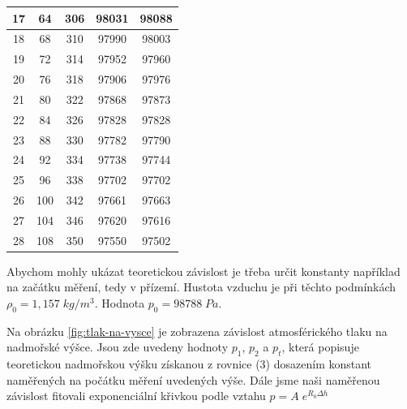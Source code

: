 \begin{table}[h]
\begin{tabular}{|c|c|c|c|c|}
17          & 64      & 306           & 98031 & 98088 \\ \hline
18          & 68      & 310           & 97990 & 98003 \\ \hline
19          & 72      & 314           & 97952 & 97960 \\ \hline
20          & 76      & 318           & 97906 & 97976 \\ \hline
21          & 80      & 322           & 97868 & 97873 \\ \hline
22          & 84      & 326           & 97828 & 97828 \\ \hline
23          & 88      & 330           & 97782 & 97790 \\ \hline
24          & 92      & 334           & 97738 & 97744 \\ \hline
25          & 96      & 338           & 97702 & 97702 \\ \hline
26          & 100     & 342           & 97661 & 97663 \\ \hline
27          & 104     & 346           & 97620 & 97616 \\ \hline
28          & 108     & 350           & 97550 & 97502 \\ \hline
\end{tabular}
\end{table}

Abychom mohly ukázat teoretickou závislost je třeba určit konstanty například na začátku měření, tedy v přízemí. Hustota vzduchu je při těchto podmínkách $\rho_0 = 1,157 \; kg/m^3$. Hodnota $p_0 = 98 788 \; Pa$.

Na obrázku \ref{fig:tlak-na-vysce} je zobrazena závislost atmosférického tlaku na nadmořské výšce. Jsou zde uvedeny hodnoty $p_1$, $p_2$ a $p_t$, která popisuje teoretickou nadmořskou výšku získanou z rovnice (3) dosazením konstant naměřených na počátku měření uvedených výše. Dále jsme naši naměřenou závislost fitovali exponenciální křivkou podle vztahu $p = A \; e^{R_0 \Delta h}$

